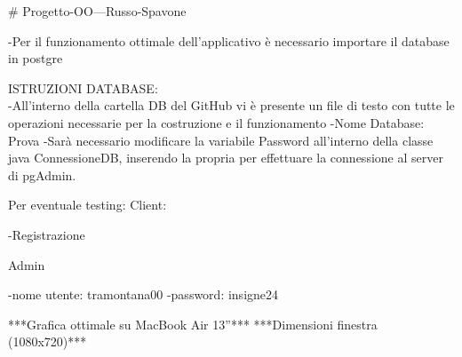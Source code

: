 # Progetto-OO---Russo-Spavone

-Per il funzionamento ottimale dell'applicativo è necessario importare il database in postgre

ISTRUZIONI DATABASE:\\
  -All'interno della cartella DB del GitHub vi è presente un file di testo con tutte le operazioni necessarie   per la costruzione e il funzionamento
  -Nome Database: Prova
  -Sarà necessario modificare la variabile Password all'interno della classe java ConnessioneDB, inserendo la   propria per effettuare la connessione al server di pgAdmin.
  
 Per eventuale testing:
 Client:
 
 
 -Registrazione
 
 
 Admin
 
 
 
    -nome utente: tramontana00
    -password: insigne24
    
    
***Grafica ottimale su MacBook Air 13''***
***Dimensioni finestra (1080x720)***
